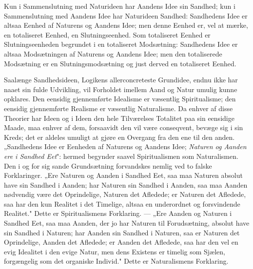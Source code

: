 \documentclass[12pt]{book}
\newcommand{\opage}[1]{\marginnote{\footnotesize\textit{[#1]}}}
\begin{document}
Kun i Sammenslutning med Naturideen har Aandens Idee sin Sandhed; kun i Sammenslutning med Aandens
Idee har Naturideen Sandhed: Sandhedens Idee er altsaa
\opage{452} Eenhed af Naturens og Aandens Idee; men denne Eenhed er, vel at mærke, en totaliseret Eenhed, en
Slutningseenhed. Som totaliseret Eenhed er Slutningseenheden begrundet i en totaliseret Modsætning:
Sandhedens Idee er altsaa Modsætningen af Naturens og Aandens Idee; men den totaliserede Modsætning er
en Slutningsmodsætning og just derved en totaliseret Eenhed.

Saalænge Sandhedsideen, Logikens allerconcreteste Grundidee, endnu ikke har naaet sin fulde Udvikling,
vil Forholdet imellem Aand og Natur umulig kunne opklares. Den eensidig gjennemførte Idealisme er
væsentlig Spiritualisme; den eensidig gjennemførte Realisme er væsentlig Naturalisme. Da enhver af
disse Theorier har Ideen og i Ideen den hele Tilværelses Totalitet paa sin eensidige Maade, maa enhver
af dem, forsaavidt den vil være conseqvent, bevæge sig i sin Kreds; det er aldeles umuligt at gjøre en
Overgang fra den ene til den anden. „Sandhedens Idee er Eenheden af Naturens og Aandens Idee;
\emph{Naturen og Aanden ere i Sandhed Eet}": hermed begynder saavel Spiritualismen som Naturalismen.
Den i og for sig sande Grundsætning forvandskes nemlig ved to falske Forklaringer. „Ere Naturen og
Aanden i Sandhed Eet, saa maa Naturen absolut have sin Sandhed i Aanden; har Naturen sin Sandhed i
Aanden, saa maa Aanden nødvendig være det Oprindelige, Naturen det Afledede; er Naturen det Afledede,
saa har den kun Realitet i det Timelige, altsaa en underordnet og forsvindende Realitet." Dette er
Spiritualismens Forklaring. — „Ere Aanden og Naturen i Sandhed Eet, saa maa Aanden, der jo har Naturen
til Forudsætning, absolut have sin Sandhed i Naturen; har Aanden sin Sandhed i Naturen, saa er Naturen
det Oprindelige, Aanden det Afledede; er Aanden det Afledede, saa har den vel en evig Idealitet i den
evige Natur, men dens Existens er timelig som Sjælen, forgængelig som det organiske Individ." Dette er
Naturalismens Forklaring.
\end{document}
